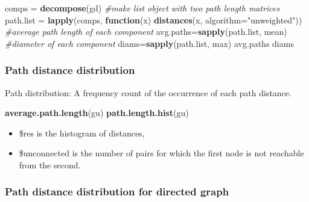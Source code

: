 \documentclass[
]{article}
\newenvironment{Shaded}{\begin{snugshade}}{\end{snugshade}}
\newcommand{\AttributeTok}[1]{\textcolor[rgb]{0.13,0.29,0.53}{#1}}
\newcommand{\CommentTok}[1]{\textcolor[rgb]{0.56,0.35,0.01}{\textit{#1}}}
\newcommand{\ControlFlowTok}[1]{\textcolor[rgb]{0.13,0.29,0.53}{\textbf{#1}}}
\newcommand{\FunctionTok}[1]{\textcolor[rgb]{0.13,0.29,0.53}{\textbf{#1}}}
\newcommand{\NormalTok}[1]{#1}
\newcommand{\OtherTok}[1]{\textcolor[rgb]{0.56,0.35,0.01}{#1}}
\newcommand{\StringTok}[1]{\textcolor[rgb]{0.31,0.60,0.02}{#1}}
\providecommand{\tightlist}{%
  \setlength{\itemsep}{0pt}\setlength{\parskip}{0pt}}
\begin{document}
\footnotesize

\begin{Shaded}
\begin{Highlighting}[]
\NormalTok{comps }\OtherTok{=} \FunctionTok{decompose}\NormalTok{(gd)}
\CommentTok{\#make list object with two path length matrices}
\NormalTok{path.list }\OtherTok{=} \FunctionTok{lapply}\NormalTok{(comps, }\ControlFlowTok{function}\NormalTok{(x) }\FunctionTok{distances}\NormalTok{(x, }\AttributeTok{algorithm=}\StringTok{"unweighted"}\NormalTok{)) }
\CommentTok{\#average path length of each component}
\NormalTok{avg.paths}\OtherTok{=}\FunctionTok{sapply}\NormalTok{(path.list, mean) }
\CommentTok{\#diameter of each component}
\NormalTok{diams}\OtherTok{=}\FunctionTok{sapply}\NormalTok{(path.list, max) }
\NormalTok{avg.paths}
\NormalTok{diams}
\end{Highlighting}
\end{Shaded}

\normalsize

\hypertarget{path-distance-distribution}{%
\subsubsection{Path distance distribution}\label{path-distance-distribution}}

Path distribution: A frequency count of the occurrence of each path distance.

\footnotesize

\begin{Shaded}
\begin{Highlighting}[]
\FunctionTok{average.path.length}\NormalTok{(gu)}
\FunctionTok{path.length.hist}\NormalTok{(gu)}
\end{Highlighting}
\end{Shaded}

\normalsize

\begin{itemize}
\tightlist
\item
  \$res is the histogram of distances,
\item
  \$unconnected is the number of pairs for which the first node is not reachable from the second.
\end{itemize}

\hypertarget{path-distance-distribution-for-directed-graph}{%
\subsubsection{Path distance distribution for directed graph}\label{path-distance-distribution-for-directed-graph}}
\end{document}
